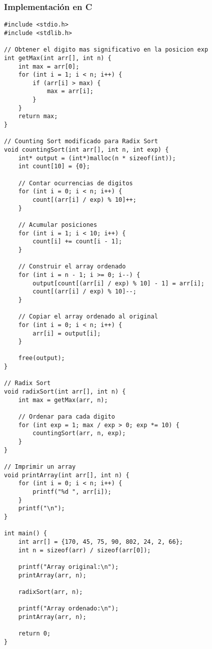 \documentclass[11pt,openany]{book}
\begin{document}
\subsubsection{Implementación en C}
\lstset{language=C}
\begin{lstlisting}
#include <stdio.h>
#include <stdlib.h>

// Obtener el digito mas significativo en la posicion exp
int getMax(int arr[], int n) {
    int max = arr[0];
    for (int i = 1; i < n; i++) {
        if (arr[i] > max) {
            max = arr[i];
        }
    }
    return max;
}

// Counting Sort modificado para Radix Sort
void countingSort(int arr[], int n, int exp) {
    int* output = (int*)malloc(n * sizeof(int));
    int count[10] = {0};

    // Contar ocurrencias de digitos
    for (int i = 0; i < n; i++) {
        count[(arr[i] / exp) % 10]++;
    }

    // Acumular posiciones
    for (int i = 1; i < 10; i++) {
        count[i] += count[i - 1];
    }

    // Construir el array ordenado
    for (int i = n - 1; i >= 0; i--) {
        output[count[(arr[i] / exp) % 10] - 1] = arr[i];
        count[(arr[i] / exp) % 10]--;
    }

    // Copiar el array ordenado al original
    for (int i = 0; i < n; i++) {
        arr[i] = output[i];
    }

    free(output);
}

// Radix Sort
void radixSort(int arr[], int n) {
    int max = getMax(arr, n);

    // Ordenar para cada digito
    for (int exp = 1; max / exp > 0; exp *= 10) {
        countingSort(arr, n, exp);
    }
}

// Imprimir un array
void printArray(int arr[], int n) {
    for (int i = 0; i < n; i++) {
        printf("%d ", arr[i]);
    }
    printf("\n");
}

int main() {
    int arr[] = {170, 45, 75, 90, 802, 24, 2, 66};
    int n = sizeof(arr) / sizeof(arr[0]);

    printf("Array original:\n");
    printArray(arr, n);

    radixSort(arr, n);

    printf("Array ordenado:\n");
    printArray(arr, n);

    return 0;
}
\end{lstlisting}
\end{document}
